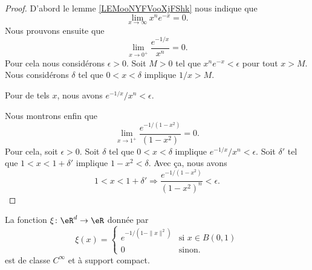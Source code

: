 \begin{proof}
	D'abord le lemme \ref{LEMooNYFVooXjFShk} nous indique que
	\begin{equation}
		\lim_{x\to \infty} x^n e^{-x}=0.
	\end{equation}
	Nous prouvons ensuite que
	\begin{equation}
		\lim_{x\to 0^+} \frac{  e^{-1/x} }{ x^n }=0.
	\end{equation}
	Pour cela nous considérons \( \epsilon>0\). Soit \( M>0\) tel que \( x^n e^{-x}<\epsilon\) pour tout \( x>M\). Nous considérons \( \delta\) tel que  \( 0<x<\delta\) implique \( 1/x>M\).

	Pour de tels \( x\), nous avons \(  e^{-1/x}/x^n<\epsilon\).

	Nous montrons enfin que
	\begin{equation}
		\lim_{x\to 1^+} \frac{ e^{-1/(1-x^2)} }{ (1-x^2) }=0.
	\end{equation}
	Pour cela, soit \( \epsilon>0\). Soit \( \delta\) tel que \( 0<x<\delta\) implique \(  e^{-1/x}/x^n<\epsilon\). Soit \( \delta'\) tel que \( 1<x<1+\delta'\) implique \( 1-x^2<\delta\). Avec ça, nous avons
	\begin{equation}
		1<x<1+\delta'\Rightarrow \frac{  e^{-1/(1-x^2)} }{ (1-x^2)^n }<\epsilon.
	\end{equation}
\end{proof}

\begin{proposition}     \label{PROPooAHLKooMFMgFq}
	La fonction \( \xi\colon \eR^d\to \eR\) donnée par
	\begin{equation}    \label{EqOBYNEMu}
		\xi(x)=\begin{cases}
			e^{-1/(1-\| x \|^2)} & \text{si } x\in B(0,1) \\
			0                    & \text{sinon}.
		\end{cases}
	\end{equation}
	est de classe \( C^{\infty}\) et à support compact.
\end{proposition}

